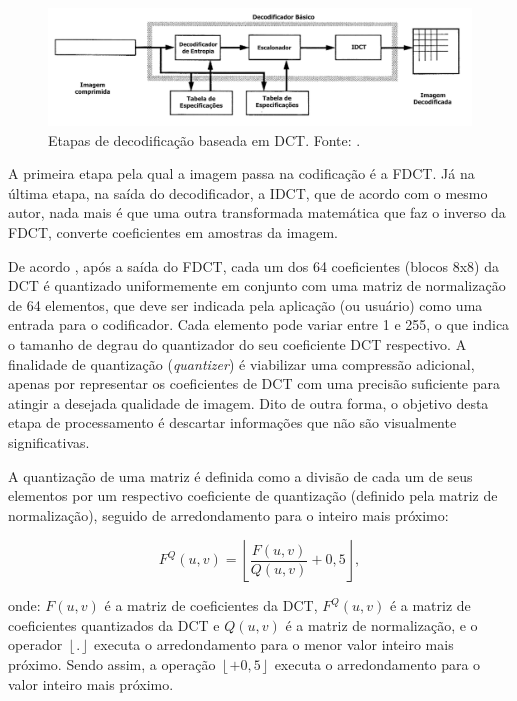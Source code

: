 \begin{figure}[h]
	\centering
	\includegraphics[scale=0.55]{figuras/DECODER-JPEG.pdf}
	\caption{Etapas de decodificação baseada em DCT. Fonte: \cite{wallace1991jpeg}.}
	\label{DECODER_JPEG}
\end{figure}
  
 A primeira etapa pela qual a imagem passa na codificação é a FDCT. Já na última etapa, na saída do decodificador, a IDCT, que de acordo com o mesmo autor, nada mais é que uma outra transformada matemática que faz o inverso da FDCT, converte coeficientes em amostras da imagem. 

De acordo \cite{wallace1991jpeg}, após a saída do FDCT, cada um dos 64 coeficientes (blocos 8x8) da DCT  é quantizado uniformemente em conjunto com uma matriz de normalização de 64 elementos, que deve ser indicada pela aplicação (ou usuário) como uma entrada para o codificador. Cada elemento pode variar entre 1 e 255, o que indica o tamanho de degrau do quantizador do seu coeficiente DCT respectivo. A finalidade de quantização (\textit{quantizer}) é viabilizar uma compressão adicional, apenas por representar os coeficientes de DCT com uma precisão suficiente para atingir a desejada qualidade de imagem. Dito de outra forma, o objetivo desta etapa de processamento é descartar informações que não são visualmente significativas. 

A quantização de uma matriz é definida como a divisão de cada um de seus elementos por um respectivo coeficiente de quantização (definido pela matriz de normalização), seguido de arredondamento para o inteiro mais próximo:
\vspace{-3mm}
\begin{flushleft}
	\begin{equation}
		F^Q(u,v)=\left \lfloor \frac{F(u,v)}{Q(u,v)} +0,5 \right \rfloor,
	\end{equation}
\end{flushleft}
onde:
			$F(u,v)$ é a matriz de coeficientes da DCT,
			$F^Q(u,v)$ é a matriz de coeficientes quantizados da DCT e
			$Q(u,v)$ é a matriz de normalização,
			e o operador $\left \lfloor . \right \rfloor$ executa o arredondamento para o menor valor inteiro mais próximo. Sendo assim, a operação $\left \lfloor  +0,5 \right \rfloor$ executa o arredondamento para o valor inteiro mais próximo.

